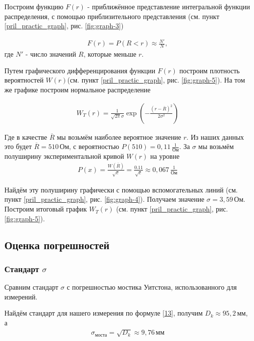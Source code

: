 Построим функцию $F(r)$ - приближённое представление интегральной функции распределения, с помощью приблизительного представления (см. пункт \ref{pril_practic_graph}, рис. \ref{fig:graph-3})

\begin{align}
	F(r) = P(R < r) \approx \frac{N'}{N},
\end{align} 
где $N'$ - число значений $R$, которые меньше $r$.

Путем графического дифференцирования функции $F(r)$ построим плотность вероятностей $W(r)$(см. пункт \ref{pril_practic_graph}, рис. \ref{fig:graph-5}). На том же графике построим нормальное распределение

\begin{align}
	W_T(r) = \frac{1}{\sqrt{2 \pi} \sigma} \exp \left(- \frac{(r - \overline{R})^2}{2 \sigma^2}\right)
\end{align}

Где в качестве $\overline{R}$ мы возьмём наиболее вероятное значение $r$. Из наших данных это будет $\overline{R} = 510\, \text{Ом}$, с вероятностью $P(510) = 0,11 \, \frac{1}{\text{Ом}}$. За $\sigma$ мы возьмём полуширину экспериментальной кривой $W(r)$ на уровне 
\begin{align*}
		P(x) = \frac{W(\overline{R})}{\sqrt{e}} = \frac{0.11}{\sqrt{e}} \approx 0,067\, \frac{1}{\text{Ом}}
\end{align*}

Найдём эту полуширину графически с помощью вспомогательных линий (см. пункт \ref{pril_practic_graph}, рис. \ref{fig:graph-4}). Получаем значение $\sigma = 3,59 \, \text{Ом}$. Построим итоговый график $W_T(r)$ (см. пункт \ref{pril_practic_graph}, рис. \ref{fig:graph-5}). 

\subsection{Оценка погрешностей}

\subsubsection{Стандарт $\sigma$}

Сравним стандарт $\sigma$ с погрешностью мостика Уитстона, использованного для измерений. 

Найдём стандарт для нашего измерения по формуле \eqref{13}, получим $D_k \approx 95,2 \, \text{мм}$, а
\begin{align*}
	\sigma_{\text{моста}} = \sqrt{D_k} \approx 9,76 \, \text{мм}
\end{align*}

